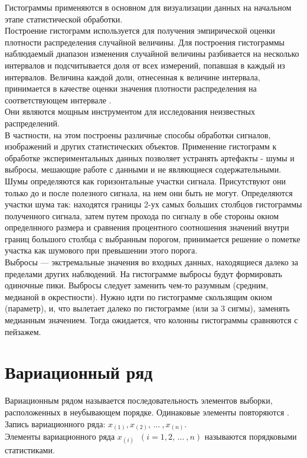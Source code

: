 \documentclass{article}
\begin{document}
Гистограммы применяются в основном для визуализации данных на начальном этапе статистической обработки.\\
Построение гистограмм используется для получения эмпирической оценки плотности распределения случайной величины. Для построения гистограммы наблюдаемый диапазон изменения случайной величины разбивается на несколько интервалов и подсчитывается доля от всех измерений, попавшая в каждый из интервалов. Величина каждой доли, отнесенная к величине интервала, принимается в качестве оценки значения плотности распределения на соответствующем интервале \cite{s:hist}.\\
Они являются мощным инструментом для исследования неизвестных распределений.\\
В частности, на этом построены различные способы обработки сигналов, изображений и других статистических объектов. Применение гистограмм к обработке экспериментальных данных позволяет устранять артефакты - шумы и выбросы, мешающие работе с данными и не являющиеся содержательными. \\
Шумы определяются как горизонтальные участки сигнала. Присутствуют они только до и
после полезного сигнала, на нем они быть не могут. Определяются участки шума так: находятся границы 2-ух самых больших столбцов гистограммы полученного сигнала, затем путем прохода по сигналу в обе стороны окном определнного размера и сравнения процентного соотношения значений внутри границ большого столбца с выбранным порогом, принимается решение о пометке участка как шумового при превышении этого порога.\\
Выбросы —  экстремальные значения во входных данных, находящиеся далеко за пределами других наблюдений. На гистограмме выбросы будут формировать одиночные пики. Выбросы следует заменить чем-то разумным (средним, медианой в окрестности). Нужно идти по гистограмме скользящим окном (параметр), и, что вылетает далеко по гистограмме (или за 3 сигмы), заменять медианным значением. Тогда ожидается, что колонны гистограммы сравняются с пейзажем.


\section{Вариационный ряд}

Вариационным рядом называется последовательность элементов выборки, расположенных в неубывающем порядке. Одинаковые элементы повторяются \cite[с. 409]{b:probSectMath}.\\
Запись вариационного ряда: $x_{(1)}, x_{(2)}, \, ... \: , x_{(n)}$.\\
Элементы вариационного ряда $x_{(i)} \;\; (i = 1, 2, \, ... \: , n)$ называются порядковыми статистиками.
\end{document}
